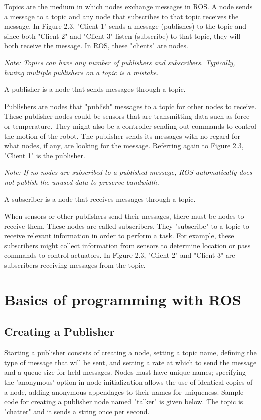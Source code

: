 \documentclass[twoside]{article}
\begin{document}
Topics are the medium in which nodes exchange messages in ROS. A node sends a message to a topic and any node that subscribes to that topic receives the message. In Figure 2.3, "Client 1" sends a message (publishes) to the topic and since both "Client 2" and "Client 3" listen (subscribe) to that topic, they will both receive the message. In ROS, these "clients" are nodes.

{\it Note: Topics can have any number of publishers and subscribers. Typically, having multiple publishers on a topic is a mistake.} \\

\begin{frm-def}[Publisher]
A publisher is a node that sends messages through a topic.
\end{frm-def}

Publishers are nodes that "publish" messages to a topic for other nodes to receive. These publisher nodes could be sensors that are transmitting data such as force or temperature. They might also be a controller sending out commands to control the motion of the robot. The publisher sends its messages with no regard for what nodes, if any, are looking for the message. Referring again to Figure 2.3, "Client 1" is the publisher.

{\it Note: If no nodes are subscribed to a published message, ROS automatically does not publish the unused data to preserve bandwidth.} \\

\begin{frm-def}[Subscriber]
A subscriber is a node that receives messages through a topic.
\end{frm-def}

When sensors or other publishers send their messages, there must be nodes to receive them. These nodes are called subscribers. They "subscribe" to a topic to receive relevant information in order to perform a task. For example, these subscribers might collect information from sensors to determine location or pass commands to control actuators. In Figure 2.3, "Client 2" and "Client 3" are subscribers receiving messages from the topic.\\

\section{Basics of programming with ROS}\label{programming}\label{sec:programming}
\subsection{Creating a Publisher}
Starting a publisher consists of creating a node, setting a topic name, defining the type of message that will be sent, and setting a rate at which to send the message and a queue size for held messages. Nodes must have unique names; specifying the 'anonymous' option in node initialization allows the use of identical copies of a node, adding anonymous appendages to their names for uniqueness.
Sample code for creating a publisher node named "talker" is given below. The topic is "chatter" and it sends a string once per second.
\end{document}
